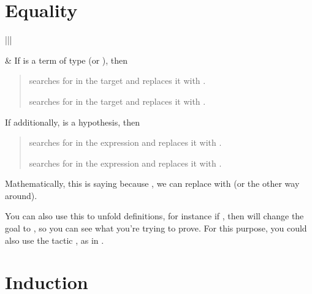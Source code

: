 \documentclass[letterpaper,10pt,english]{sphinxmanual}
\begin{document}
\section{Equality}
\label{\detokenize{tactics:equality}}

\begin{savenotes}\sphinxattablestart
\centering
\begin{tabular}[t]{|||}
\hline

\sphinxAtStartPar
{}
&
\sphinxAtStartPar
If  is a term of type  (or ), then
\begin{quote}

\sphinxAtStartPar
{} searches for  in the target and replaces it with .

\sphinxAtStartPar
{} searches for  in the target and replaces it with .
\end{quote}

\sphinxAtStartPar
If additionally,  is a hypothesis, then
\begin{quote}

\sphinxAtStartPar
{} searches for  in the expression  and replaces it with .

\sphinxAtStartPar
{} searches for  in the expression  and replaces it with .
\end{quote}

\sphinxAtStartPar
Mathematically, this is saying because , we can replace  with  (or the other way around).

\sphinxAtStartPar
You can also use this to unfold definitions, for instance if , then
 will change the goal  to
, so you can see what you’re trying to prove.
For this purpose, you could also use the tactic , as in .
\\
\hline
\end{tabular}
\par
\sphinxattableend\end{savenotes}


\section{Induction}
\label{\detokenize{tactics:induction}}


\renewcommand{\indexname}{Index}
\printindex
\end{document}
